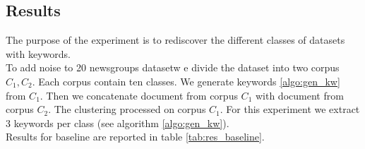 \subsection{Results}
The purpose of the experiment is to rediscover the different classes of 
datasets with keywords.\\
To add noise to 20 newsgroups datasetw e divide the dataset into two corpus $C_1, C_2$. 
Each corpus contain ten classes. We generate keywords \ref{algo:gen_kw} 
from $C_1$. Then we concatenate document from corpus $C_1$ with document
from corpus $C_2$. The clustering processed on corpus $C_1$. For this experiment
we extract 3 keywords per class (see algorithm \ref{algo:gen_kw}).
\\Results for baseline are reported in table \ref{tab:res_baseline}.

\begin{table}
\caption{\label{tab:res_mask}Clustering applies to 
different learned latent space to measure the efficiency of lexical constraints
for $K$-Means algorithm. Performance is measured in terms of NMI, Adjusted Rand 
Index and clustering Accuracy, higher is better. Each cell contains the average
and the standard deviation computed over 10 runs.}
\centering
{}
\end{table}
